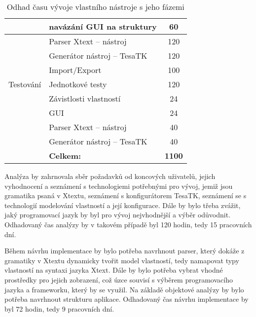 \begin{table}[H]
\begin{tabular}{|l|l|c|}
\hline
                                                 & navázání GUI na struktury   & 60                              \\ 
\hline
                                                 & Parser Xtext – nástroj      & 120                             \\ 
\hline
                                                 & Generátor nástroj – TesaTK  & 120                             \\ 
\hline
                                                 & Import/Export               & 100                             \\ 
\hline
Testování                                        & Jednotkové testy            & 120                             \\ 
\hline
                                                 & Závistlosti vlastností      & 24                              \\ 
\hline
                                                 & GUI                         & 24                              \\ 
\hline
                                                 & Parser Xtext – nástroj      & 40                              \\ 
\hline
                                                 & Generátor nástroj – TesaTK  & 40                              \\ 
\hline
\rowcolor[rgb]{0.937,0.937,0.937}                & \textbf{Celkem:}            & \textbf{1100}                   \\
\bottomrule
\end{tabular}
\caption{Odhad času vývoje vlastního nástroje s jeho fázemi}
\end{table}

Analýza by zahrnovala sběr požadavků od koncových uživatelů, jejich vyhodnocení a seznámení s technologiemi potřebnými pro vývoj, jemiž jsou gramatika psaná v Xtextu, seznámení s konfigurátorem TesaTK, seznámení se s technologií modelování vlastností a její konfigurace. Dále by bylo třeba zvážit, jaký programovací jazyk by byl pro vývoj nejvhodnější a výběr odůvodnit. Odhadovaný čas analýzy by v takovém případě byl 120 hodin, tedy 15 pracovních dní. 

Během návrhu implementace by bylo potřeba navrhnout parser, který dokáže z gramatiky v Xtextu dynamicky tvořit model vlastností, tedy namapovat typy vlastností na syntaxi jazyka Xtext. Dále by bylo potřeba vybrat vhodné prostředky pro jejich zobrazení, což úzce souvisí s výběrem programovacího jazyka a frameworku, který by se využil. Na základě objektové analýzy by bylo potřeba navrhnout strukturu aplikace. Odhadovaný čas návrhu implementace by byl 72 hodin, tedy 9 pracovních dní.

